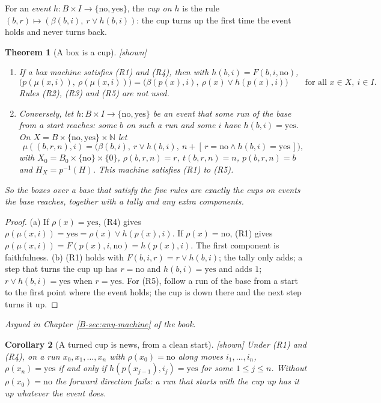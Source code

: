 \documentclass[11pt, a4paper]{article}
\theoremstyle{plain}
\newtheorem{theorem}{Theorem}[section]
\newtheorem{corollary}[theorem]{Corollary}
\theoremstyle{definition}
\theoremstyle{remark}
\newcommand{\N}{\mathbb{N}}
\newcommand{\Bool}{\{\mathrm{no},\mathrm{yes}\}}
\newcommand{\inv}{^{-1}}
\newcommand{\argued}[1]{\par\noindent\textit{Argued in Chapter~\ref{B-#1} of the book.}\par}
\newcommand{\kind}[1]{\textup{[#1]}}
\begin{document}
For an \emph{event} $h:B\times I\to\Bool$, the \emph{cup on $h$} is the rule
$(b,r)\mapsto(\beta(b,i),\ r\lor h(b,i))$: the cup turns up the first time the event holds and never
turns back.

\begin{theorem}[A box is a cup]\label{spec:box-is-cup} \kind{shown}
\begin{enumerate}[label=(\alph*)]
\item If a box machine satisfies (R1) and (R4), then with $h(b,i)=F(b,i,\mathrm{no})$,
\[
\bigl(p(\mu(x,i)),\ \rho(\mu(x,i))\bigr)=\bigl(\beta(p(x),i),\ \rho(x)\lor h(p(x),i)\bigr)
\qquad\text{for all }x\in X,\ i\in I .
\]
Rules (R2), (R3) and (R5) are not used.
\item Conversely, let $h:B\times I\to\Bool$ be an event that some run of the base from a start reaches:
some $b$ on such a run and some $i$ have $h(b,i)=\mathrm{yes}$. On $X=B\times\Bool\times\N$ let
\[
\mu((b,r,n),i)=\bigl(\beta(b,i),\ r\lor h(b,i),\ n+[\,r=\mathrm{no}\wedge h(b,i)=\mathrm{yes}\,]\bigr),
\]
with $X_0=B_0\times\{\mathrm{no}\}\times\{0\}$, $\rho(b,r,n)=r$, $t(b,r,n)=n$, $p(b,r,n)=b$ and
$H_X=p\inv(H)$. This machine satisfies (R1) to (R5).
\end{enumerate}
So the boxes over a base that satisfy the five rules are exactly the cups on events the base reaches,
together with a tally and any extra components.
\end{theorem}

\begin{proof}
(a) If $\rho(x)=\mathrm{yes}$, (R4) gives $\rho(\mu(x,i))=\mathrm{yes}=\rho(x)\lor h(p(x),i)$. If
$\rho(x)=\mathrm{no}$, (R1) gives $\rho(\mu(x,i))=F(p(x),i,\mathrm{no})=h(p(x),i)$. The first component is
faithfulness.
(b) (R1) holds with $F(b,i,r)=r\lor h(b,i)$; the tally only adds; a step that turns the cup up has
$r=\mathrm{no}$ and $h(b,i)=\mathrm{yes}$ and adds $1$; $r\lor h(b,i)=\mathrm{yes}$ when $r=\mathrm{yes}$.
For (R5), follow a run of the base from a start to the first point where the event holds; the cup is down
there and the next step turns it up.
\end{proof}

\argued{sec:any-machine}

\begin{corollary}[A turned cup is news, from a clean start]\label{spec:clean-start} \kind{shown}
Under (R1) and (R4), on a run $x_0,x_1,\dots,x_n$ with $\rho(x_0)=\mathrm{no}$ along moves
$i_1,\dots,i_n$, $\rho(x_n)=\mathrm{yes}$ if and only if $h(p(x_{j-1}),i_j)=\mathrm{yes}$ for some
$1\le j\le n$. Without $\rho(x_0)=\mathrm{no}$ the forward direction fails: a run that starts with the cup
up has it up whatever the event does.
\end{corollary}
\end{document}
